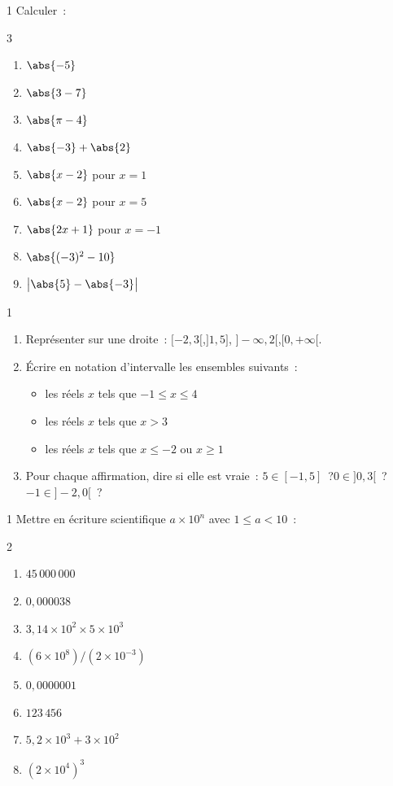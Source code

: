 \begin{exo}{1}
Calculer~:
\begin{multicols}{3}
\begin{enumerate}
  \item $\abs{-5}$
  \item $\abs{3-7}$
  \item $\abs{\pi-4}$
  \item $\abs{-3}+\abs{2}$
  \item $\abs{x-2}$ pour $x=1$
  \item $\abs{x-2}$ pour $x=5$
  \item $\abs{2x+1}$ pour $x=-1$
  \item $\abs{(-3)^2-10}$
  \item $\bigl|\abs{5}-\abs{-3}\bigr|$
\end{enumerate}
\end{multicols}
\end{exo}

\begin{exo}{1}
\begin{enumerate}
  \item Repr\'esenter sur une droite~: $[-2,3[$,\quad $]1,5]$,\quad
        $]-\infty,2[$,\quad $[0,+\infty[$.
  \item \'Ecrire en notation d'intervalle les ensembles suivants~:
        \begin{itemize}
          \item les r\'eels $x$ tels que $-1 \leq x \leq 4$
          \item les r\'eels $x$ tels que $x > 3$
          \item les r\'eels $x$ tels que $x \leq -2$ ou $x \geq 1$
        \end{itemize}
  \item Pour chaque affirmation, dire si elle est vraie~:
        $5 \in [-1,5]$~?\quad $0 \in ]0,3[$~?\quad $-1 \in ]-2,0[$~?
\end{enumerate}
\end{exo}

\begin{exo}{1}
Mettre en \'ecriture scientifique $a\times10^n$ avec $1\leq a < 10$~:
\begin{multicols}{2}
\begin{enumerate}
  \item $45\,000\,000$
  \item $0{,}000038$
  \item $3{,}14 \times 10^2 \times 5 \times 10^3$
  \item $(6 \times 10^8)/(2 \times 10^{-3})$
  \item $0{,}0000001$
  \item $123\,456$
  \item $5{,}2\times10^3 + 3\times10^2$
  \item $(2\times10^4)^3$
\end{enumerate}
\end{multicols}
\end{exo}

